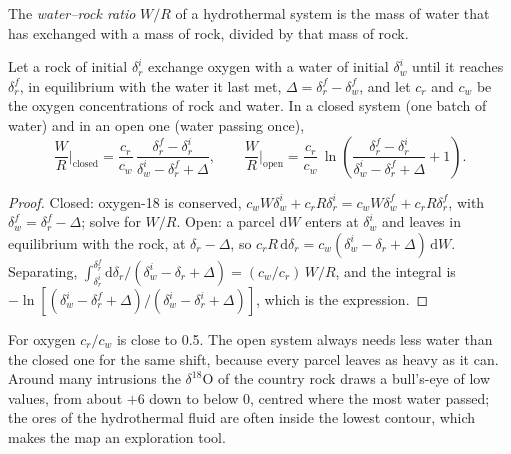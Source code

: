 \begin{definition}\label{def:b3:water-rock-interaction:water-rock-ratio}
The \emph{water--rock ratio} $W/R$ of a
hydrothermal system is the mass of water that has exchanged with a mass of
rock, divided by that mass of rock.
\end{definition}

\begin{proposition}\label{prop:b3:water-rock-interaction:wr}
Let a rock of initial $\delta_r^i$ exchange oxygen with a water of initial
$\delta_w^i$ until it reaches $\delta_r^f$, in equilibrium with the water
it last met, $\Delta = \delta_r^f - \delta_w^f$, and let $c_r$ and $c_w$ be
the oxygen concentrations of rock and water. In a closed system (one batch of
water) and in an open one (water passing once),
\[
\frac WR\Big|_{\text{closed}} = \frac{c_r}{c_w}\,
\frac{\delta_r^f - \delta_r^i}{\delta_w^i - \delta_r^f + \Delta},
\qquad
\frac WR\Big|_{\text{open}} = \frac{c_r}{c_w}\,
\ln\!\left(\frac{\delta_r^f - \delta_r^i}{\delta_w^i - \delta_r^f + \Delta} + 1\right).
\]
\end{proposition}

\begin{proof}
Closed: oxygen-18 is conserved, $c_wW\delta_w^i + c_rR\delta_r^i = c_wW
\delta_w^f + c_rR\delta_r^f$, with $\delta_w^f = \delta_r^f - \Delta$; solve
for $W/R$. Open: a parcel $\mathrm dW$ enters at $\delta_w^i$ and leaves in
equilibrium with the rock, at $\delta_r - \Delta$, so $c_rR\,\mathrm d\delta_r
= c_w(\delta_w^i - \delta_r + \Delta)\,\mathrm dW$. Separating,
$\int_{\delta_r^i}^{\delta_r^f}\mathrm d\delta_r/(\delta_w^i - \delta_r +
\Delta) = (c_w/c_r)\,W/R$, and the integral is $-\ln[(\delta_w^i - \delta_r^f
+ \Delta)/(\delta_w^i - \delta_r^i + \Delta)]$, which is the expression.
\end{proof}

For oxygen $c_r/c_w$ is close to 0.5. The open system always needs less
water than the closed one for the same shift, because every parcel leaves
as heavy as it can. Around many intrusions the $\delta^{18}\mathrm O$ of the
country rock draws a bull's-eye of low values, from about $+6$ down to below
0, centred where the most water passed; the ores of the hydrothermal fluid
are often inside the lowest contour, which makes the map an exploration
tool.


